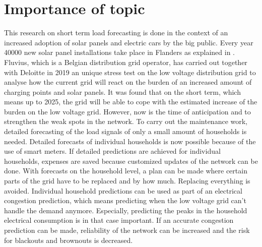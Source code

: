 \section{Importance of topic}
This research on short term load forecasting is done in the context of an increased adoption of solar panels and electric cars by the big public. Every year 40000 new solar panel installations take place in Flanders as explained in \cite{Lemmens2019}. Fluvius, which is a Belgian distribution grid operator, has carried out together with Deloitte in 2019 an unique stress test on the low voltage distribution grid to analyse how the current grid will react on the burden of an increased amount of charging points and solar panels. It was found that on the short term, which means up to 2025, the grid will be able to cope with the estimated increase of the burden on the low voltage grid. However, now is the time of anticipation and to strengthen the weak spots in the network. To carry out the maintenance work, detailed forecasting of the load signals of only a small amount of households is needed. Detailed forecasts of individual households is now possible because of the use of smart meters. If detailed predictions are achieved for individual households, expenses are saved because customized updates of the network can be done. With forecasts on the household level, a plan can be made where certain parts of the grid have to be replaced and by how much. Replacing everything is avoided. Individual household predictions can be used as part of an electrical congestion prediction, which means predicting when the low voltage grid can't handle the demand anymore. Especially, predicting the peaks in the household electrical consumption is in that case important. If an accurate congestion prediction can be made, reliability of the network can be increased and the risk for blackouts and brownouts is decreased.\\


